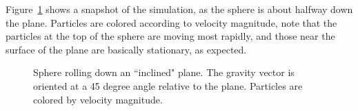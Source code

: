 \documentclass[fleqn]{article}
\begin{document}
Figure~\ref{figincplaneSphere} shows a snapshot of the simulation, as
the sphere is about halfway down the plane.  Particles are colored according
to velocity magnitude, note that the particles at the top of the sphere
are moving most rapidly, and those near the surface of the plane are 
basically stationary, as expected.
\begin{figure}[b]
  \center
  \caption{Sphere rolling down an ``inclined" plane.  The gravity vector
is oriented at a 45 degree angle relative to the plane.  Particles are colored
by velocity magnitude.}
  \label{figincplaneSphere}
\end{figure}


\end{document}
